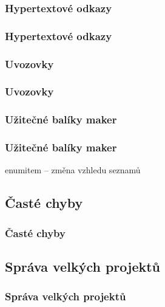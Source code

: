\subsubsection{Hypertextové odkazy}
\begin{frame}
	\frametitle{Hypertextové odkazy}
\end{frame}


\subsubsection{Uvozovky}
\begin{frame}
	\frametitle{Uvozovky}
\end{frame}


\subsubsection{Užitečné balíky maker}
\begin{frame}
	\frametitle{Užitečné balíky maker}
	enumitem -- změna vzhledu seznamů
\end{frame}


\subsection{Časté chyby}
\begin{frame}
	\frametitle{Časté chyby}
\end{frame}


\subsection{Správa velkých projektů}
\begin{frame}
	\frametitle{Správa velkých projektů}
\end{frame}

\endinput